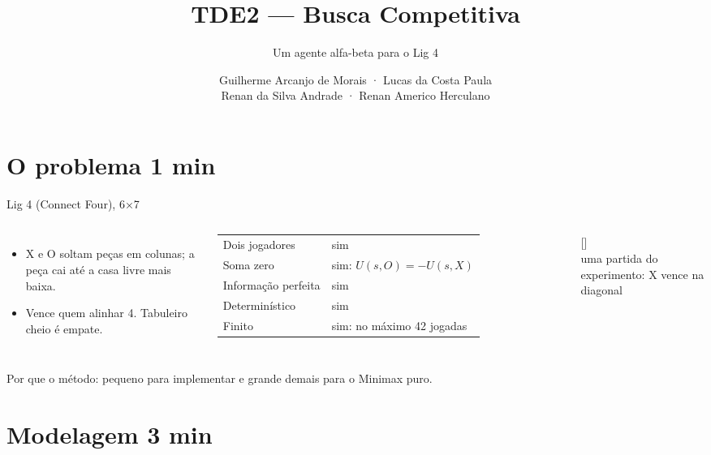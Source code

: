 \documentclass[10pt,aspectratio=169]{beamer}
\title{TDE2 --- Busca Competitiva}
\subtitle{Um agente alfa-beta para o Lig 4}
\author{\small Guilherme Arcanjo de Morais · Lucas da Costa Paula\\ Renan da Silva Andrade · Renan Americo Herculano}
\institute{\footnotesize PUCPR · Inteligência Artificial (PCO118A) · Prof. Carlos Costa Cedro · RA2}
\date{}
\newcommand{\tempo}[1]{\hfill{\scriptsize\color{black!45}#1}}
\begin{document}
\maketitle

\section{O problema \tempo{1 min}}

\begin{frame}{Lig 4 (Connect Four), 6×7}
\begin{columns}[c]
\begin{itemize}
  \item X e O soltam peças em colunas; a peça cai até a casa livre mais baixa.
  \item Vence quem alinhar 4. Tabuleiro cheio é empate.
\end{itemize}
\medskip
\small
\begin{tabular}{@{}ll@{}}
\toprule
Dois jogadores & sim \\
Soma zero & sim: $U(s,O) = -U(s,X)$ \\
Informação perfeita & sim \\
Determinístico & sim \\
Finito & sim: no máximo 42 jogadas \\
\bottomrule
\end{tabular}
\centering
\tabuleiro[x=6mm,y=6mm]{\tabZzFinal}[\tabZzFinalVence]\\[4pt]
{\scriptsize uma partida do experimento: X vence na diagonal}
\end{columns}
\medskip
\alert{Por que o método:} pequeno para implementar e grande demais para o Minimax puro.
\end{frame}

\section{Modelagem \tempo{3 min}}
\end{document}

